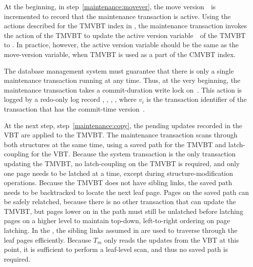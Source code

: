 At the beginning, in step~\ref{maintenance:movever}, the move
version~\movever\ is incremented to record that the maintenance transaction is
active.
Using the actions described for the TMVBT index in ,
the maintenance transaction invokes the  action of the
TMVBT to update the active version variable~\actver\ of the TMVBT to
\movever. 
In practice, however, the active version variable should be the same as the
move-version variable, when TMVBT is used as a part of the CMVBT index.

The database management system must guarantee that there is only a
single maintenance transaction running at any time.
Thus, at the very beginning, the maintenance transaction takes a
commit-duration write lock on~\movever.
This action is logged by a redo-only log record
, , \movever, , where $v_i$ is the
transaction identifier of the transaction that has the commit-time
version~\movever.

At the next step, step~\ref{maintenance:copy}, the pending updates recorded
in the VBT are applied to the TMVBT\@.
The maintenance transaction scans through both structures at the same
time, using a saved path for the TMVBT and latch-coupling for the VBT\@.
Because the system transaction is the only transaction updating the TMVBT, no
latch-coupling on the TMVBT is required, and only one page needs to be
latched at a time, except during structure-modification operations.
Because the TMVBT does not have sibling links, the saved path needs to be
backtracked to locate the next leaf page.
Pages on the saved path can be safely relatched, because there is no other
transaction that can update the TMVBT, but pages lower on in the path must
still be unlatched before latching pages on a higher level to maintain
top-down, left-to-right ordering on page latching.
In the , the sibling links assumed in
 are used to traverse through the leaf
pages efficiently.
Because $T_m$ only reads the updates from the VBT at this point,
it is sufficient to perform a leaf-level scan, and thus no saved path is
required.

